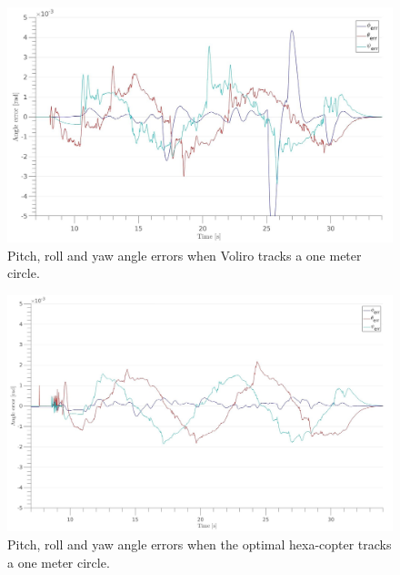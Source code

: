 \begin{figure}[!ht]
  \begin{center}
    \includegraphics[width=1.0\linewidth]{images/Voliro_circle_angle.jpg}
    \caption{Pitch, roll and yaw angle errors when Voliro tracks a one meter circle.}
    \label{fig:Voliro_angle_circle}
  \end{center}
\end{figure}

\begin{figure}[!ht]
  \begin{center}
    \includegraphics[width=1.0\linewidth]{images/Hexa_circle_angle.jpg}
    \caption{Pitch, roll and yaw angle errors when the optimal hexa-copter tracks a one meter circle.}
    \label{fig:Hexa_angle_circle}
  \end{center}
\end{figure}

